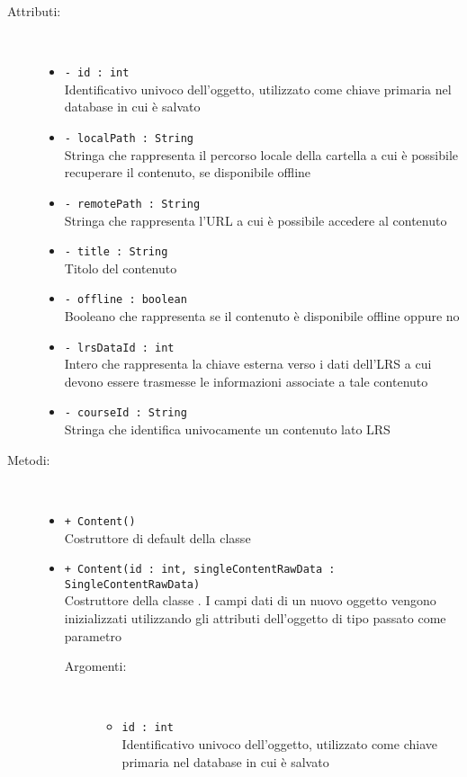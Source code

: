 \documentclass[../Tesi.tex]{subfiles}
\begin{document}
		\begin{description}
			\item[Attributi:] \
			\begin{itemize}
				\item \texttt{- id : int}\\
				Identificativo univoco dell'oggetto, utilizzato come chiave primaria nel database in cui è salvato

				\item \texttt{- localPath : String}\\
				Stringa che rappresenta il percorso locale della cartella a cui è possibile recuperare il contenuto, se disponibile offline

				\item \texttt{- remotePath : String}\\
				Stringa che rappresenta l'URL a cui è possibile accedere al contenuto

				\item \texttt{- title : String}\\
				Titolo del contenuto

				\item \texttt{- offline : boolean}\\
				Booleano che rappresenta se il contenuto è disponibile offline oppure no

				\item \texttt{- lrsDataId : int}\\
				Intero che rappresenta la chiave esterna verso i dati dell'LRS a cui devono essere trasmesse le informazioni associate a tale contenuto

				\item \texttt{- courseId : String}\\
				Stringa che identifica univocamente un contenuto lato LRS
			\end{itemize}

			\item[Metodi:] \
			\begin{itemize}
				\item \texttt{+ Content()}\\
				Costruttore di default della classe 

				\item \texttt{+ Content(id : int, singleContentRawData : \\SingleContentRawData)}\\
				Costruttore della classe . I campi dati di un nuovo oggetto vengono inizializzati utilizzando gli attributi dell'oggetto di tipo  passato come parametro
				\begin{description}
					\item[Argomenti:] \
					\begin{itemize}
						\item \texttt{id : int}\\
						Identificativo univoco dell'oggetto, utilizzato come chiave primaria nel database in cui è salvato


\end{itemize}
\end{description}
\end{itemize}
\end{description}
\end{document}
